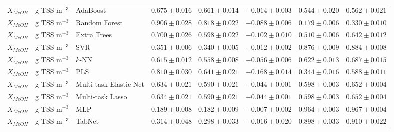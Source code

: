 \begin{longtable}{llp{3.1cm}rrrrr}
$X_{MeOH}$ & g TSS m$^{-3}$ & AdaBoost & $0.675\pm0.016$ & $0.661\pm0.014$ & $-0.014\pm0.003$ & $0.544\pm0.020$ & $0.562\pm0.021$ \\
$X_{MeOH}$ & g TSS m$^{-3}$ & Random Forest & $0.906\pm0.028$ & $0.818\pm0.022$ & $-0.088\pm0.006$ & $0.179\pm0.006$ & $0.330\pm0.010$ \\
$X_{MeOH}$ & g TSS m$^{-3}$ & Extra Trees & $0.700\pm0.026$ & $0.598\pm0.022$ & $-0.102\pm0.010$ & $0.510\pm0.006$ & $0.642\pm0.012$ \\
$X_{MeOH}$ & g TSS m$^{-3}$ & SVR & $0.351\pm0.006$ & $0.340\pm0.005$ & $-0.012\pm0.002$ & $0.876\pm0.009$ & $0.884\pm0.008$ \\
$X_{MeOH}$ & g TSS m$^{-3}$ & $k$-NN & $0.615\pm0.012$ & $0.558\pm0.008$ & $-0.056\pm0.006$ & $0.622\pm0.013$ & $0.687\pm0.015$ \\
$X_{MeOH}$ & g TSS m$^{-3}$ & PLS & $0.810\pm0.030$ & $0.641\pm0.021$ & $-0.168\pm0.014$ & $0.344\pm0.016$ & $0.588\pm0.011$ \\
$X_{MeOH}$ & g TSS m$^{-3}$ & Multi-task Elastic Net & $0.634\pm0.021$ & $0.590\pm0.021$ & $-0.044\pm0.001$ & $0.598\pm0.003$ & $0.652\pm0.004$ \\
$X_{MeOH}$ & g TSS m$^{-3}$ & Multi-task Lasso & $0.634\pm0.021$ & $0.590\pm0.021$ & $-0.044\pm0.001$ & $0.598\pm0.003$ & $0.652\pm0.004$ \\
$X_{MeOH}$ & g TSS m$^{-3}$ & MLP & $0.189\pm0.008$ & $0.182\pm0.009$ & $-0.007\pm0.002$ & $0.964\pm0.003$ & $0.967\pm0.004$ \\
$X_{MeOH}$ & g TSS m$^{-3}$ & TabNet & $0.314\pm0.048$ & $0.298\pm0.033$ & $-0.016\pm0.020$ & $0.898\pm0.033$ & $0.910\pm0.022$ \\
\end{longtable}
